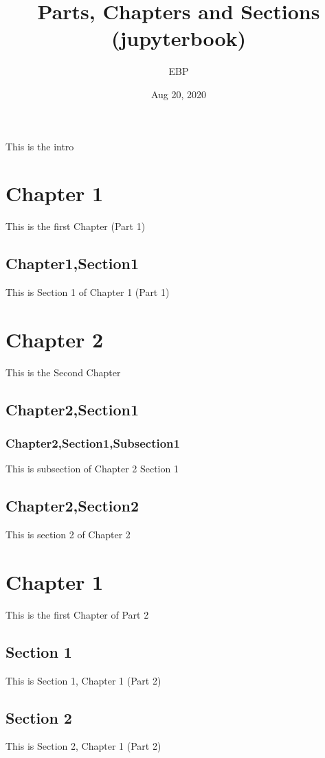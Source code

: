 \documentclass[letterpaper,10pt,english]{sphinxmanual}
\title{Parts, Chapters and Sections (jupyterbook)}
\date{Aug 20, 2020}
\author{EBP}
\begin{document}
\pagestyle{empty}
\sphinxmaketitle
\pagestyle{plain}
\sphinxtableofcontents
\pagestyle{normal}
\label{\detokenize{intro::doc}}


This is the intro


\chapter{Chapter 1}
\label{\detokenize{part1/chapter1:chapter-1}}\label{\detokenize{part1/chapter1::doc}}
This is the first Chapter (Part 1)


\section{Chapter1,Section1}
\label{\detokenize{part1/chapter1:chapter1-section1}}
This is Section 1 of Chapter 1 (Part 1)


\chapter{Chapter 2}
\label{\detokenize{part1/chapter2:chapter-2}}\label{\detokenize{part1/chapter2::doc}}
This is the Second Chapter


\section{Chapter2,Section1}
\label{\detokenize{part1/chapter2:chapter2-section1}}

\subsection{Chapter2,Section1,Subsection1}
\label{\detokenize{part1/chapter2:chapter2-section1-subsection1}}
This is subsection of Chapter 2 Section 1


\section{Chapter2,Section2}
\label{\detokenize{part1/chapter2:chapter2-section2}}
This is section 2 of Chapter 2


\chapter{Chapter 1}
\label{\detokenize{part2/chapter1:chapter-1}}\label{\detokenize{part2/chapter1::doc}}
This is the first Chapter of Part 2


\section{Section 1}
\label{\detokenize{part2/chapter1-section1:section-1}}\label{\detokenize{part2/chapter1-section1::doc}}
This is Section 1, Chapter 1 (Part 2)


\section{Section 2}
\label{\detokenize{part2/chapter1-section2:section-2}}\label{\detokenize{part2/chapter1-section2::doc}}
This is Section 2, Chapter 1 (Part 2)







\renewcommand{\indexname}{Index}
\printindex
\end{document}
